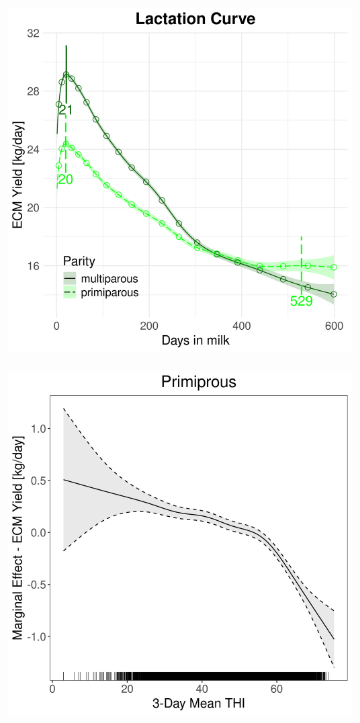 \begin{figure}[H]
\begin{subfigure}[b]{0.45\textwidth}
        \includegraphics[width=\textwidth]{thesis/figures/models/ecm/before2010/je_ecm_before2010/je_ecm_before2010_marginal_dim_milk_combined.png}
    \end{subfigure}
    \begin{subfigure}[b]{0.45\textwidth}
        \centering
        \includegraphics[width=\textwidth]{thesis/figures/models/ecm/before2010/je_ecm_before2010/je_ecm_before2010_marginal_thi_milk_primi.png}

\end{subfigure}
\end{figure}
